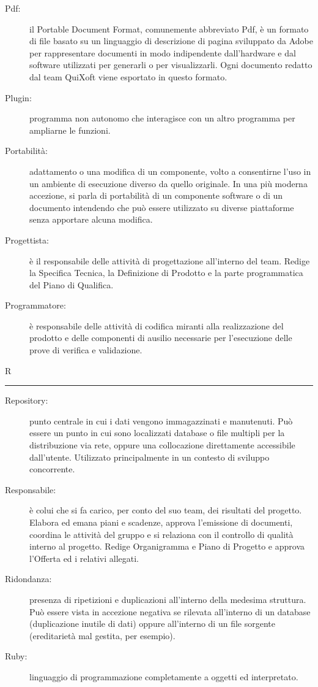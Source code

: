 \documentclass[11pt,a4paper]{article}
\begin{document}
\begin{description}
	\item[Pdf:] il Portable Document Format, comunemente abbreviato Pdf, è un formato di file basato su un linguaggio di descrizione di pagina sviluppato da Adobe per rappresentare documenti in modo indipendente dall'hardware e dal software utilizzati per generarli o per visualizzarli. Ogni documento redatto dal team QuiXoft viene esportato in questo formato.
	\item[Plugin:] programma non autonomo che interagisce con un altro programma per ampliarne le funzioni.
	\item[Portabilità:] adattamento o una modifica di un componente, volto a consentirne l'uso in un ambiente di esecuzione diverso da quello originale. In una più moderna accezione, si parla di portabilità di un componente software o di un documento intendendo che può essere utilizzato su diverse piattaforme senza apportare alcuna modifica.
	\item[Progettista:] è il responsabile delle attività di progettazione all'interno del team. Redige la Specifica Tecnica, la Definizione di Prodotto e la parte programmatica del Piano di Qualifica.
	\item[Programmatore:] è responsabile delle attività di codifica miranti alla realizzazione del prodotto e delle componenti di ausilio necessarie per l'esecuzione delle prove di verifica e validazione.
\end{description}
\bigskip
\Huge R \bigskip
\hrule
\smallskip
\normalsize
\begin{description}
	\item[Repository:] punto centrale in cui i dati vengono immagazzinati e manutenuti. Può essere un punto in cui sono localizzati database o file multipli per la distribuzione via rete, oppure una collocazione direttamente accessibile dall'utente. Utilizzato principalmente in un contesto di sviluppo concorrente.
	\item[Responsabile:] è colui che si fa carico, per conto del suo team, dei risultati del progetto. Elabora ed emana piani e scadenze, approva l'emissione di documenti, coordina le attività del gruppo e si relaziona con il controllo di qualità interno al progetto. Redige Organigramma e Piano di Progetto e approva l'Offerta ed i relativi allegati.
	\item[Ridondanza:] presenza di ripetizioni e duplicazioni all'interno della medesima struttura. Può essere vista in accezione negativa se rilevata all'interno di un database (duplicazione inutile di dati) oppure all'interno di un file sorgente (ereditarietà mal gestita, per esempio).
	\item[Ruby:] linguaggio di programmazione completamente a oggetti ed interpretato.
\end{description}
\end{document}
